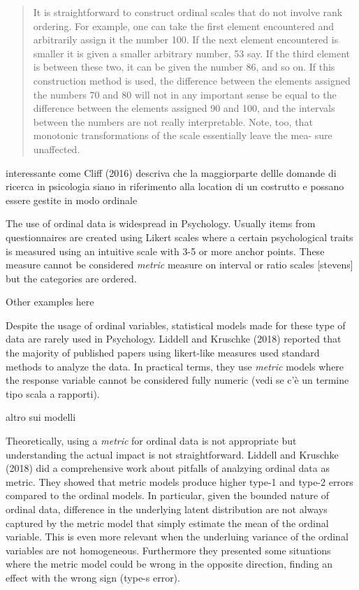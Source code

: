 \documentclass[
  man,floatsintext]{apa6}
\begin{document}
\begin{quote}
It is straightforward to construct ordinal scales that do not involve rank ordering. For example, one can take the first element encountered and arbitrarily assign it the number 100. If the next element encountered is smaller it is given a smaller arbitrary number, 53 say. If the third element is between these two, it can be given the number 86, and so on. If this construction method is used, the difference between the elements assigned the numbers 70 and 80 will not in any important sense be equal to the difference between the elements assigned 90 and 100, and the intervals between the numbers are not really interpretable. Note, too, that monotonic transformations of the scale essentially leave the mea- sure unaffected.
\end{quote}

interessante come Cliff (2016) descriva che la maggiorparte dellle domande di ricerca in psicologia siano in riferimento alla location di un costrutto e possano essere gestite in modo ordinale

The use of ordinal data is widespread in Psychology. Usually items from questionnaires are created using Likert scales where a certain psychological traits is measured using an intuitive scale with 3-5 or more anchor points. These measure cannot be considered \emph{metric} measure on interval or ratio scales {[}stevens{]} but the categories are ordered.

Other examples here

Despite the usage of ordinal variables, statistical models made for these type of data are rarely used in Psychology. Liddell and Kruschke (2018) reported that the majority of published papers using likert-like measures used standard methods to analyze the data. In practical terms, they use \emph{metric} models where the response variable cannot be considered fully numeric (vedi se c'è un termine tipo scala a rapporti).

altro sui modelli

Theoretically, using a \emph{metric} for ordinal data is not appropriate but understanding the actual impact is not straightforward. Liddell and Kruschke (2018) did a comprehensive work about pitfalls of analzying ordinal data as metric. They showed that metric models produce higher type-1 and type-2 errors compared to the ordinal models. In particular, given the bounded nature of ordinal data, difference in the underlying latent distribution are not always captured by the metric model that simply estimate the mean of the ordinal variable. This is even more relevant when the underluing variance of the ordinal variables are not homogeneous. Furthermore they presented some situations where the metric model could be wrong in the opposite direction, finding an effect with the wrong sign (type-s error).
\end{document}
